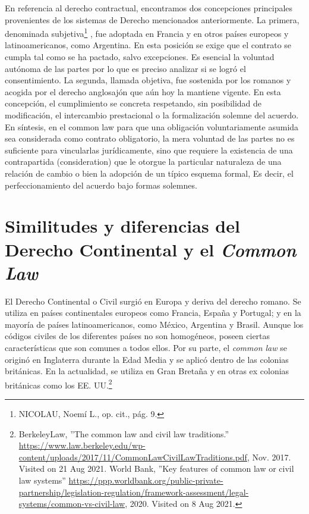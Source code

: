 \documentclass[12pt]{report} %
\begin{document}
En referencia al derecho contractual, encontramos dos concepciones principales provenientes de los sistemas de Derecho mencionados anteriormente. La primera, denominada subjetiva\footnote{NICOLAU, Noemí L., op. cit., pág. 9.} , fue adoptada en Francia y en otros países  europeos  y  latinoamericanos,  como  Argentina.  En  esta posición  se exige que el contrato se cumpla tal como se ha pactado, salvo excepciones. Es esencial  la voluntad autónoma  de las partes  por lo que es preciso analizar si se logró el consentimiento. La segunda, llamada objetiva, fue sostenida por los romanos y acogida por el derecho anglosajón que aún hoy la mantiene vigente. En esta concepción, el cumplimiento se concreta respetando, sin posibilidad de modificación, el intercambio prestacional o la formalización solemne del acuerdo. En síntesis, en el common law para que una obligación voluntariamente asumida sea considerada como contrato obligatorio, la mera voluntad de las partes no es suficiente para vincularlas jurídicamente, sino que requiere la existencia de una contrapartida (consideration) que le otorgue la particular naturaleza de una relación de cambio o bien la adopción de un típico esquema formal, Es decir, el perfeccionamiento del acuerdo bajo formas solemnes. 



\section{Similitudes y diferencias del Derecho Continental y el \textit{Common Law}}

El Derecho Continental o Civil surgió en Europa y deriva del derecho romano. Se utiliza en países continentales europeos como Francia, España y Portugal; y en la mayoría de países latinoamericanos, como México, Argentina y Brasil. Aunque los códigos civiles de los diferentes países no son homogéneos, poseen ciertas características que son comunes a todos ellos. Por su parte, el \textit{common law} se originó en Inglaterra durante la Edad Media y se aplicó dentro de las colonias británicas. En la actualidad, se utiliza en Gran Bretaña y en otras ex colonias británicas como los EE. UU.\footnote{BerkeleyLaw, ''The common law and civil law traditions.'' \url{https://www.law.berkeley.edu/wp-content/uploads/2017/11/CommonLawCivilLawTraditions.pdf}, Nov. 2017. Visited on 21 Aug 2021. World Bank, ''Key features of common law or civil law systems'' \url{https://ppp.worldbank.org/public-private-partnership/legislation-regulation/framework-assessment/legal-systems/common-vs-civil-law}, 2020. Visited on 8 Aug 2021.} 
\end{document}
